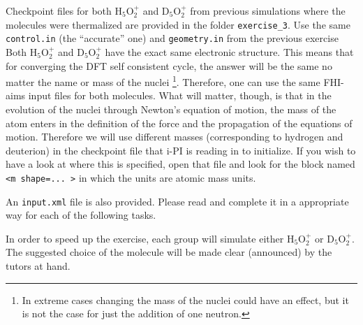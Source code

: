 \documentclass[a4paper,11pt]{scrartcl}
\begin{document}
Checkpoint files for both H$_5$O$_2^+$ and D$_5$O$_2^+$ from 
previous simulations where the molecules were thermalized are provided in the folder \texttt{exercise\_3}.
Use the same \texttt{control.in} (the ``accurate'' one) and  \texttt{geometry.in} from the previous exercise 
Both H$_5$O$_2^+$ and D$_5$O$_2^+$ have the exact same electronic structure. This means that for converging the DFT self consistent cycle, the answer will
be the same no matter the name or mass of the nuclei \footnote{In extreme cases changing the mass of the nuclei could have an effect, but it is not the case for just the addition of one neutron.}.
Therefore, one can use the same FHI-aims input files for both molecules. What will matter, though, is that in the evolution of the nuclei through Newton's equation of motion, the mass of the atom
enters in the definition of the force and the propagation of the equations of motion. Therefore we will use different masses (corresponding to hydrogen and deuterion) in the checkpoint file that i-PI is
reading in to initialize. If you wish to have a look at where this is specified, open that file and look for the block named \texttt{<m shape=... >} in which the units are atomic mass units.


An \texttt{input.xml} file is also provided. Please read and complete it in a appropriate way for each of the following tasks.


In order to speed up the exercise, each group will simulate either H$_5$O$_2^+$ or D$_5$O$_2^+$.
The suggested choice of the molecule will be made clear (announced) by the tutors at hand.

\end{document}
